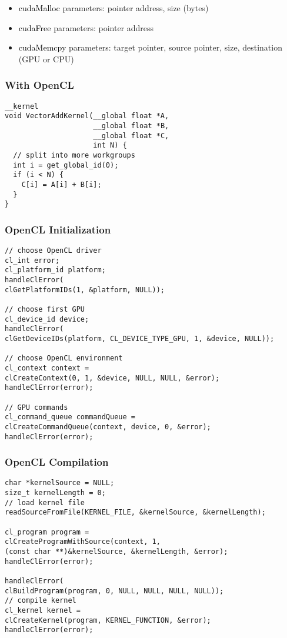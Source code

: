 \documentclass[main.tex,fontsize=8pt,paper=a4,paper=portrait,DIV=calc,]{scrartcl}
\begin{document}
\begin{itemize}
\item \textcolor{black}{cudaMalloc}\newline
  parameters: pointer address, size (bytes)
\item \textcolor{black}{cudaFree}\newline
  parameters: pointer address
\item \textcolor{black}{cudaMemcpy}\newline
  parameters: target pointer, source pointer, size, destination (GPU or CPU)
\end{itemize} 

\subsubsection{With OpenCL}
\begin{lstlisting}
__kernel
void VectorAddKernel(__global float *A,
                     __global float *B,
                     __global float *C,
                     int N) {
  // split into more workgroups
  int i = get_global_id(0);
  if (i < N) {
    C[i] = A[i] + B[i];
  }
}
\end{lstlisting}

\subsubsection{OpenCL Initialization}
\begin{lstlisting}
// choose OpenCL driver
cl_int error;
cl_platform_id platform;
handleClError(
clGetPlatformIDs(1, &platform, NULL));

// choose first GPU
cl_device_id device;
handleClError(
clGetDeviceIDs(platform, CL_DEVICE_TYPE_GPU, 1, &device, NULL));

// choose OpenCL environment
cl_context context =
clCreateContext(0, 1, &device, NULL, NULL, &error);
handleClError(error);

// GPU commands
cl_command_queue commandQueue =
clCreateCommandQueue(context, device, 0, &error);
handleClError(error);
\end{lstlisting}

\subsubsection{OpenCL Compilation}
\begin{lstlisting}
char *kernelSource = NULL;
size_t kernelLength = 0;
// load kernel file
readSourceFromFile(KERNEL_FILE, &kernelSource, &kernelLength);

cl_program program =
clCreateProgramWithSource(context, 1,
(const char **)&kernelSource, &kernelLength, &error);
handleClError(error);

handleClError(
clBuildProgram(program, 0, NULL, NULL, NULL, NULL));
// compile kernel
cl_kernel kernel =
clCreateKernel(program, KERNEL_FUNCTION, &error);
handleClError(error);
\end{lstlisting}
\end{document}
